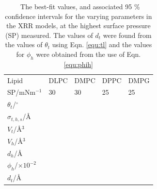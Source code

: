 \documentclass[11pt,a4paper]{paper}
\begin{document}
\begin{table}
  \centering
	\caption{\ The best-fit values, and associated 95 \% confidence intervals for the varying parameters in the XRR models, at the highest surface pressure (SP) measured. The values of $d_t$ were found from the values of $\theta_t$ using Eqn. \ref{equ:tl} and the values for $\phi_h$ were obtained from the use of Eqn. \ref{equ:phih}}
	\label{tab:liptab1}
	\begin{tabular}{l|l|l|l|l}
		Lipid & DLPC & DMPC & DPPC & DMPG \\
    SP/mNm$^{-1}$ & 30 & 30 & 25 & 25 \\
		\hline
		$\theta_t$/$^\circ$ &  &  &  &  \\
		$\sigma_{t,h,s}$/\AA &  &  &  &  \\
    \hline
    $V_t$/\AA$^3$ &  &  &  &  \\
		$V_h$/\AA$^3$ &  &  &  &  \\
		$d_h$/\AA &  &  &  &  \\
    \hline
    $\phi_h$/$\times10^{-2}$ &  &  &  &  \\
		$d_t$/\AA &  &  &  &  \\
	\end{tabular}
\end{table}
%
%
\end{document}
